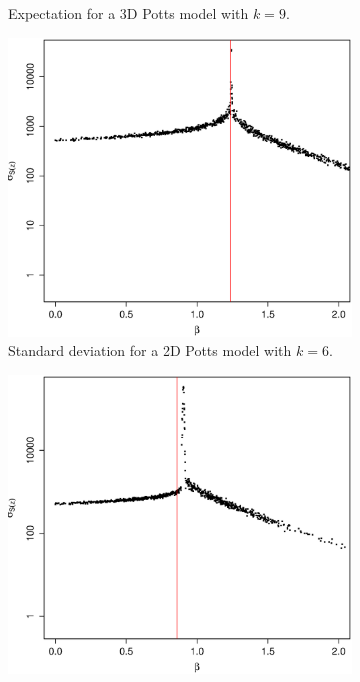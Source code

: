 \documentclass[nojss,shortnames]{jss}\usepackage[]{graphicx}\usepackage[]{color}
\begin{document}
\begin{figure}
\begin{subfigure}{0.45\textwidth}
                \caption{Expectation for a 3D Potts model with $k = 9$.}
                \label{f:bcrit3d}
        \end{subfigure}%
\qquad
        \begin{subfigure}{0.45\textwidth}
                \includegraphics[width=\textwidth]{bcrit2d_sd.eps}
                \caption{Standard deviation for a 2D Potts model with $k = 6$.}
                \label{f:bcrit2d_sd}
        \end{subfigure}%
\qquad
        \begin{subfigure}{0.45\textwidth}
                \includegraphics[width=\textwidth]{bcrit3d_sd.eps}

\end{subfigure}
\end{figure}
\end{document}
